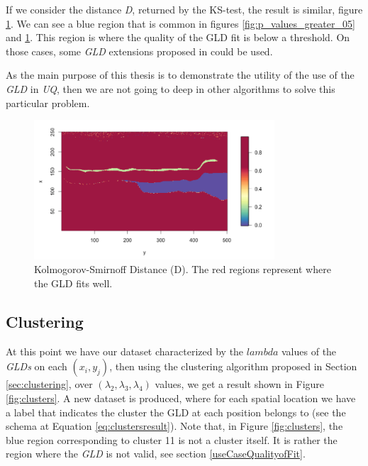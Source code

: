 If we consider the distance \textit{D}, returned by the KS-test, the result is similar, figure \ref{fig:kolmogorov_distance}. We can see a blue region that is common in figures \ref{fig:p_values_greater_05} and \ref{fig:kolmogorov_distance}. This region is where the quality of the GLD fit is below a threshold. 
On those cases, some \textit{GLD} extensions proposed in \cite{Karian2011} could be used.

As the main purpose of this thesis is to demonstrate the utility of the use of the \textit{GLD} in \textit{UQ}, then we are not going to deep in other algorithms to solve this particular problem.

\begin{figure}[H]
    \centering
    \includegraphics[width=0.8\textwidth]{images/kolmogorov_distance.png}
    \caption{Kolmogorov-Smirnoff Distance (D). The red regions represent where the GLD fits well.}
    \label{fig:kolmogorov_distance}
\end{figure}

\subsection{Clustering}\label{useCaseClustering}
At this point we have our dataset characterized by the $lambda$ values of the \textit{GLDs} on each $(x_{i},y_{j})$, then using the clustering algorithm proposed in Section \ref{sec:clustering}, over $(\lambda_{2}, \lambda_{3}, \lambda_{4})$ values, we get a result shown in Figure \ref{fig:clusters}. A new dataset is produced, where for each spatial location we have a label that indicates the cluster the GLD at each position belongs to (see the schema at Equation \ref{eq:clustersresult}). Note that, in Figure \ref{fig:clusters}, the blue region corresponding to cluster 11 is not a cluster itself. It is rather the region where the \textit{GLD} is not valid, see section \ref{useCaseQualityofFit}.

